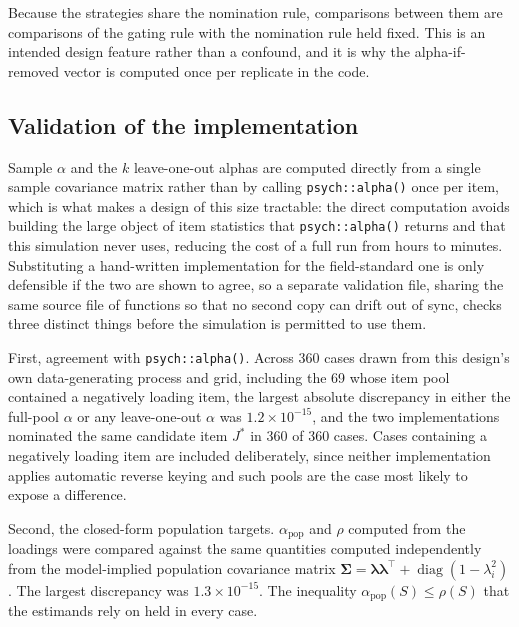 \documentclass[
  nonatbib,
  authoryear,
  preprint]{elsarticle}
\begin{document}
Because the strategies share the nomination rule, comparisons between
them are comparisons of the gating rule with the nomination rule held
fixed. This is an intended design feature rather than a confound, and it
is why the alpha-if-removed vector is computed once per replicate in the
code.

\subsection{Validation of the
implementation}\label{validation-of-the-implementation}

Sample \(\alpha\) and the \(k\) leave-one-out alphas are computed
directly from a single sample covariance matrix rather than by calling
\texttt{psych::alpha()} once per item, which is what makes a design of
this size tractable: the direct computation avoids building the large
object of item statistics that \texttt{psych::alpha()} returns and that
this simulation never uses, reducing the cost of a full run from hours
to minutes. Substituting a hand-written implementation for the
field-standard one is only defensible if the two are shown to agree, so
a separate validation file, sharing the same source file of functions so
that no second copy can drift out of sync, checks three distinct things
before the simulation is permitted to use them.

First, agreement with \texttt{psych::alpha()}. Across 360 cases drawn
from this design's own data-generating process and grid, including the
69 whose item pool contained a negatively loading item, the largest
absolute discrepancy in either the full-pool \(\alpha\) or any
leave-one-out \(\alpha\) was \(1.2 \times 10^{-15}\), and the two
implementations nominated the same candidate item \(J^{*}\) in 360 of
360 cases. Cases containing a negatively loading item are included
deliberately, since neither implementation applies automatic reverse
keying and such pools are the case most likely to expose a difference.

Second, the closed-form population targets. \(\alpha_{\text{pop}}\) and
\(\rho\) computed from the loadings were compared against the same
quantities computed independently from the model-implied population
covariance matrix
\(\boldsymbol\Sigma = \boldsymbol\lambda\boldsymbol\lambda^\top + \operatorname{diag}(1 - \lambda_i^2)\).
The largest discrepancy was \(1.3 \times 10^{-15}\). The inequality
\(\alpha_{\text{pop}}(S) \leq \rho(S)\) that the estimands rely on held
in every case.
\end{document}
